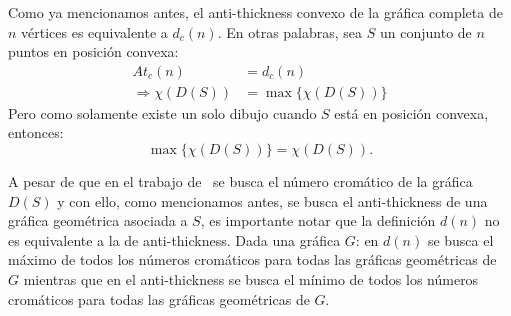 Como ya mencionamos antes, el anti-thickness convexo de la gráfica completa de $n$ vértices es equivalente a $d_c(n)$. En otras palabras, sea $S$ un conjunto
de $n$ puntos en posición convexa:
\begin{align*}
  At_c(n) &= d_c(n) \\
  \Rightarrow \chi(D(S)) &= \max\{\chi(D(S))\}
\end{align*}
Pero como solamente existe un solo dibujo cuando $S$ está en posición convexa,
entonces:
\[
\max\{\chi(D(S))\} = \chi(D(S)).
\]

A pesar de que en el trabajo de~\cite{Araujo2005} se busca el número cromático
de la gráfica $D(S)$ y con ello, como mencionamos antes, se busca el
anti-thickness de una gráfica geométrica asociada a $S$, es importante notar
que la definición $d(n)$ no es equivalente a la de anti-thickness. Dada una
gráfica $G$: en $d(n)$ se busca el máximo de todos los números cromáticos para
todas las gráficas geométricas de $G$ mientras que en el anti-thickness se
busca el mínimo de todos los números cromáticos para todas las gráficas
geométricas de $G$.




